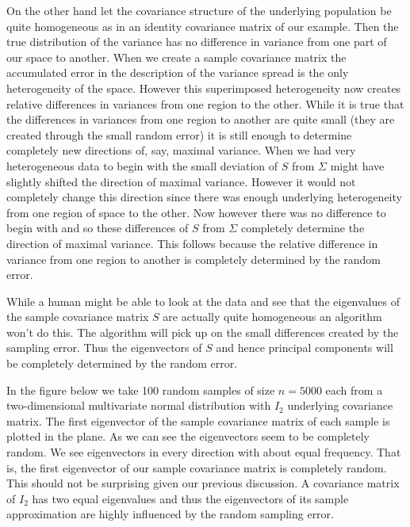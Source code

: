 \documentclass{book}
\begin{document}
On the other hand let the covariance structure of the underlying population be quite homogeneous as in an identity covariance matrix of our example. Then the true distribution of the variance has no difference in variance from one part of our space to another. When we create a sample covariance matrix the accumulated error in the description of the variance spread is the only heterogeneity of the space. However this superimposed heterogeneity now creates relative differences in variances from one region to the other. While it is true that the differences in variances from one region to another are quite small (they are created through the small random error) it is still enough to determine completely new directions of, say, maximal variance. When we had very heterogeneous data to begin with the small deviation of $S$ from $\Sigma$ might have slightly shifted the direction of maximal variance. However it would not completely change this direction since there was enough underlying heterogeneity from one region of space to the other. Now however there was no difference to begin with and so these differences of $S$ from $\Sigma$ completely determine the direction of maximal variance. This follows because the relative difference in variance from one region to another is completely determined by the random error. 

While a human might be able to look at the data and see that the eigenvalues of the sample covariance matrix $S$ are actually quite homogeneous an algorithm won't do this. The algorithm will pick up on the small differences created by the sampling error. Thus the eigenvectors of $S$ and hence principal components will be completely determined by the random error. 

In the figure below we take 100 random samples of size $n=5000$ each from a two-dimensional multivariate normal distribution with $I_2$ underlying covariance matrix. The first eigenvector of the sample covariance matrix of each sample is plotted in the plane. As we can see the eigenvectors seem to be completely random. We see eigenvectors in every direction with about equal frequency. That is, the first eigenvector of our sample covariance matrix is completely random. This should not be surprising given our previous discussion. A covariance matrix of $I_2$ has two equal eigenvalues and thus the eigenvectors of its sample approximation are highly influenced by the random sampling error.
\end{document}
